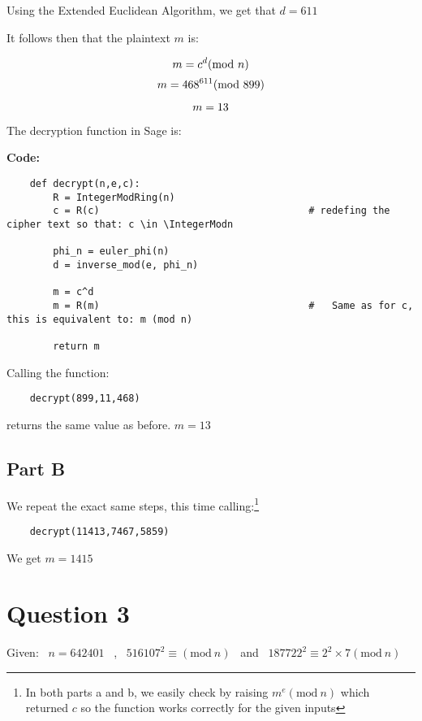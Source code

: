 \documentclass{article}
\numberwithin{equation}{subsection}
\begin{document}
Using the Extended Euclidean Algorithm, we get that $d = 611$ 

It follows then that the plaintext $m$ is:

\begin{equation}\notag
	m = c^d (\textrm{mod} \ n)		
\end{equation}
\begin{equation}\notag
	m = 468^{611} (\textrm{mod}\ 899)
\end{equation}

\begin{equation}\notag
	m = 13	
\end{equation}

The decryption function in Sage is:

\textbf{Code:}
\begin{lstlisting}
	def decrypt(n,e,c):
		R = IntegerModRing(n)
		c = R(c)									# redefing the cipher text so that: c \in \IntegerModn 
		
		phi_n = euler_phi(n)
		d = inverse_mod(e, phi_n)

		m = c^d
		m = R(m)									#	Same as for c, this is equivalent to: m (mod n)
		
		return m
\end{lstlisting}

Calling the function:
\begin{lstlisting}
	decrypt(899,11,468)
\end{lstlisting}  
returns the same value as before. $m=13$
\vspace{25pt}

\subsection*{Part B}
We repeat the exact same steps, this time calling:\footnote{In both parts a and b, we easily check by raising $m^e (\textrm{mod} \ n)$
which returned $c$ so the function works correctly for the given inputs}
\begin{lstlisting}
	decrypt(11413,7467,5859)
\end{lstlisting}
We get $m=1415$


\newpage
	\thispagestyle{fancy}

\section*{Question 3}
Given: \ $n=642401$ \ , \ $516107^2 \equiv (\textrm{mod}\ n)$ \ and \ $187722^2 \equiv 2^2 \times 7 (\textrm{mod}\ n)$
\end{document}
